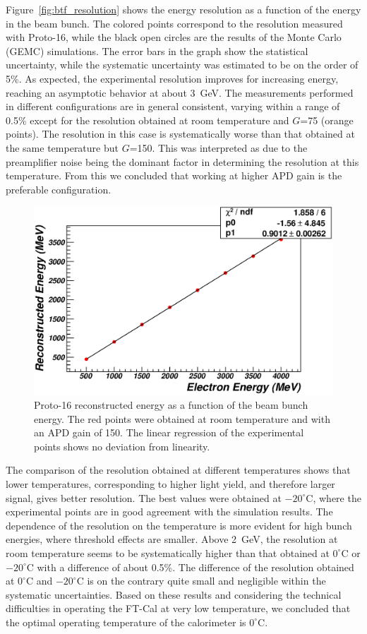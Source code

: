 Figure~\ref{fig:btf_resolution} shows the energy resolution as a function of the energy in the beam bunch. The
colored points correspond to the resolution measured with Proto-16, while the black open circles are the results
of the Monte Carlo (GEMC) simulations. The error bars in the graph show the statistical uncertainty, while the
systematic uncertainty was estimated to be on the order of 5\%.  As expected, the experimental resolution
improves for increasing energy, reaching an asymptotic behavior at about 3~GeV. The measurements performed in
different configurations are in general consistent, varying within a range of 0.5\% except for the resolution obtained
at room temperature and $G$=75 (orange points). The resolution in this case is systematically worse than that
obtained at the same temperature but $G$=150. This was interpreted as due to the preamplifier noise being the
dominant factor in determining the resolution at this temperature. From this we concluded that working at higher
APD gain is the preferable configuration. 

\begin{figure}
\includegraphics[width=1.0\columnwidth]{fig/btf_linearity_1876_2_6.eps}
\caption{Proto-16 reconstructed energy as a function of the beam bunch energy. The red points were obtained at
  room temperature and with an APD gain of 150. The linear regression of the experimental points shows no deviation
  from linearity.}
\label{fig:btf_linearity}
\end{figure}

The comparison of the resolution obtained at different temperatures shows that lower temperatures,
corresponding to higher light yield, and therefore larger signal, gives better resolution. The best values were
obtained at $-20^{\circ}$C, where the experimental points are in good agreement with the simulation results. The
dependence of the resolution on the temperature is more evident for high bunch energies, where threshold
effects are smaller. Above 2~GeV, the resolution at room temperature seems to be systematically higher than that
obtained at $0^\circ$C or $-20^\circ$C with a difference of about 0.5\%. The difference of the resolution obtained
at $0^\circ$C and $-20^\circ$C is on the contrary quite small and negligible within the systematic uncertainties. Based
on these results and considering the technical difficulties in operating the FT-Cal at very low temperature, we
concluded that the optimal operating temperature of the calorimeter is $0^\circ$C.

